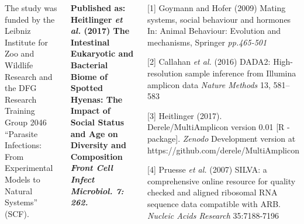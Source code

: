 \documentclass[30pt, a0paper, portrait, margin=0mm, innermargin=15mm,
               blockverticalspace=15mm, colspace=15mm, subcolspace=8mm]{tikzposter}
\begin{document}
\begin{columns}
{
  The study was funded by the Leibniz Institute for Zoo and
  Wildlife Research and the DFG Research Training Group 2046
  ``Parasite Infections: From Experimental Models to Natural
  Systems'' (SCF).

  \textbf{Published as:
  \hangindent=2cm  Heitlinger \textit{et al.} (2017) The
    Intestinal Eukaryotic and Bacterial Biome of Spotted Hyenas:
    The Impact of Social Status and Age on Diversity and
    Composition \textit{Front Cell Infect Microbiol. 7: 262.}}
}

      {
        \begin{small}

           \hangindent=2cm [1] Goymann and Hofer (2009) Mating
           systems, social behaviour and hormones In: Animal
           Behaviour: Evolution and mechanisms, Springer
           \textit{pp.465-501}
          
          \hangindent=2cm [2] Callahan \textit{et al.} (2016) DADA2:
          High-resolution sample inference from Illumina amplicon data
          \textit{Nature Methods} 13, 581--583

          \hangindent=2cm [3] Heitlinger (2017). Derele/MultiAmplicon
          version 0.01 [R - package]. \textit{Zenodo} Development
          version at https://github.com/derele/MultiAmplicon

          \hangindent=2cm [4] Pruesse \textit{et al.} (2007) SILVA: a
          comprehensive online resource for quality checked and
          aligned ribosomal RNA sequence data compatible with
          ARB. \textit{Nucleic Acids Research} 35:7188-7196

          
        \end{small}
      }


\end{columns}

\end{document}

